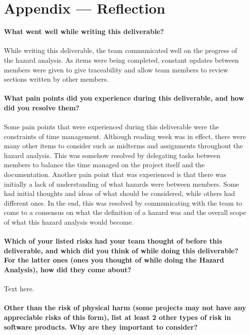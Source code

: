 \documentclass{article}
\begin{document}

\newpage{}

\section*{Appendix --- Reflection}


% 

\textbf{What went well while writing this deliverable?}
\\\\
While writing this deliverable, the team communicated well on the progress of the hazard analysis. As items were being completed, constant updates between members were given to give traceability and allow team members to review sections written by other members.
\\\\
\textbf{What pain points did you experience during this deliverable, and how did you resolve them?}
\\\\
Some pain points that were experienced during this deliverable were the constraints of time management. Although reading week was in effect, there were many other items to consider such as midterms and assignments throughout the hazard analysis. This was somehow resolved by delegating tasks between members to balance the time managed on the project itself and the documentation. Another pain point that was experienced is that there was initially a lack of understanding of what hazards were between members. Some had initial thoughts and ideas of what should be considered, while others had different ones. In the end, this was resolved by communicating with the team to come to a consensus on what the definition of a hazard was and the overall scope of what this hazard analysis would become.
\\\\
\textbf{Which of your listed risks had your team thought of before this deliverable, and which did you think of while doing this deliverable? For
the latter ones (ones you thought of while doing the Hazard Analysis), how did they come about?}
\\\\
Text here.
\\\\
\textbf{Other than the risk of physical harm (some projects may not have any appreciable risks of this form), list at least 2 other types of risk in
software products. Why are they important to consider?}
\end{document}
